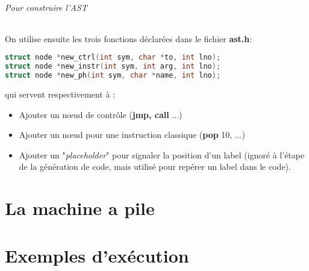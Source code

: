 \documentclass[14pt,a4paper]{article}
\begin{document}
	\paragraph{Pour construire l'AST}
	On utilise ensuite les trois fonctions déclarées dans le fichier \textbf{ast.h}:
	
	\begin{lstlisting}[frame=simple,language=C]	
struct node *new_ctrl(int sym, char *to, int lno);
struct node *new_instr(int sym, int arg, int lno);
struct node *new_ph(int sym, char *name, int lno);
	\end{lstlisting}	
	
	qui servent respectivement à :
	\begin{itemize}
		\item Ajouter un nœud de contrôle (\textbf{jmp, call} ...)
		\item Ajouter un nœud pour une instruction classique (\textbf{pop} 10, ...)
		\item Ajouter un "\textit{placeholder}" pour signaler la position d'un label (ignoré à l'étape de la génération de code, mais utilisé pour repérer un label dans le code).
	\end{itemize}
	
	\newpage
	
	\part{La machine a pile}
	
	\newpage
	
	\part{Exemples d'exécution}
	
\end{document}
